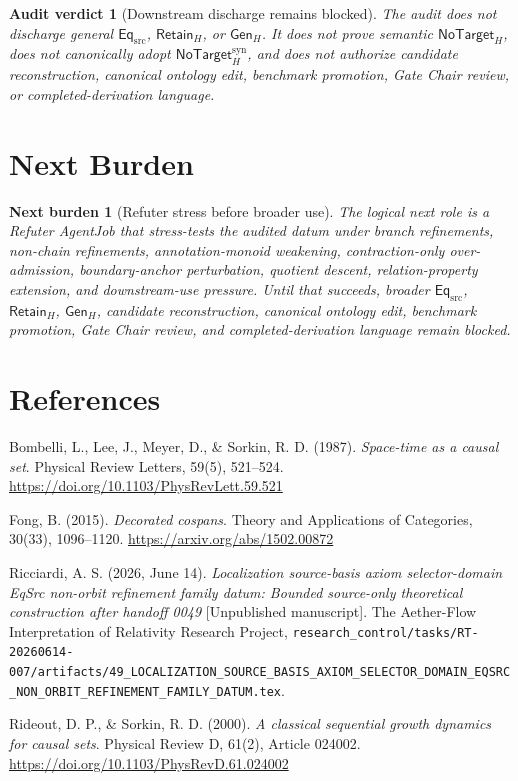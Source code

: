 \documentclass[11pt]{article}
\newcommand{\EqSrc}{\mathsf{Eq}_{\mathrm{src}}}
\newcommand{\RetainH}{\mathsf{Retain}_{H}}
\newcommand{\GenH}{\mathsf{Gen}_{H}}
\newcommand{\NoTargetH}{\mathsf{NoTarget}_{H}}
\newcommand{\NoTargetSyn}{\mathsf{NoTarget}_{H}^{\mathrm{syn}}}
\newtheorem{auditverdict}{Audit verdict}
\newtheorem{nextburden}{Next burden}
\begin{document}
\begin{auditverdict}[Downstream discharge remains blocked]
The audit does not discharge general \(\EqSrc\), \(\RetainH\), or
\(\GenH\). It does not prove semantic \(\NoTargetH\), does not
canonically adopt \(\NoTargetSyn\), and does not authorize candidate
reconstruction, canonical ontology edit, benchmark promotion, Gate Chair
review, or completed-derivation language.
\end{auditverdict}

\section{Next Burden}

\begin{nextburden}[Refuter stress before broader use]
The logical next role is a Refuter AgentJob that stress-tests the audited
datum under branch refinements, non-chain refinements, annotation-monoid
weakening, contraction-only over-admission, boundary-anchor perturbation,
quotient descent, relation-property extension, and downstream-use
pressure. Until that succeeds, broader \(\EqSrc\), \(\RetainH\),
\(\GenH\), candidate reconstruction, canonical ontology edit, benchmark
promotion, Gate Chair review, and completed-derivation language remain
blocked.
\end{nextburden}

\section*{References}

Bombelli, L., Lee, J., Meyer, D., \& Sorkin, R. D. (1987).
\emph{Space-time as a causal set}. Physical Review Letters, 59(5),
521--524. \url{https://doi.org/10.1103/PhysRevLett.59.521}

Fong, B. (2015). \emph{Decorated cospans}. Theory and Applications of
Categories, 30(33), 1096--1120. \url{https://arxiv.org/abs/1502.00872}

Ricciardi, A. S. (2026, June 14). \emph{Localization source-basis axiom
selector-domain EqSrc non-orbit refinement family datum: Bounded
source-only theoretical construction after handoff 0049} [Unpublished
manuscript]. The Aether-Flow Interpretation of Relativity Research
Project,
\texttt{research\_control/tasks/RT-20260614-007/artifacts/49\_LOCALIZATION\_SOURCE\_BASIS\_AXIOM\_SELECTOR\_DOMAIN\_EQSRC\_NON\_ORBIT\_REFINEMENT\_FAMILY\_DATUM.tex}.

Rideout, D. P., \& Sorkin, R. D. (2000). \emph{A classical sequential
growth dynamics for causal sets}. Physical Review D, 61(2), Article
024002. \url{https://doi.org/10.1103/PhysRevD.61.024002}
\end{document}

